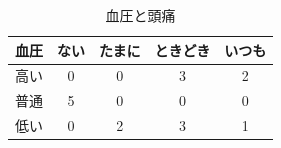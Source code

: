 \begin{table}[ht]
	\begin{center}
		\caption{血圧と頭痛}
		\begin{tabular}{c|cccc}
			血圧 & ない & たまに & ときどき & いつも \\
			\hline
			高い & 0  & 0   & 3    & 2   \\
			普通 & 5  & 0   & 0    & 0   \\
			低い & 0  & 2   & 3    & 1   \\
		\end{tabular}
		\label{tbl::14_01}
	\end{center}
\end{table}
